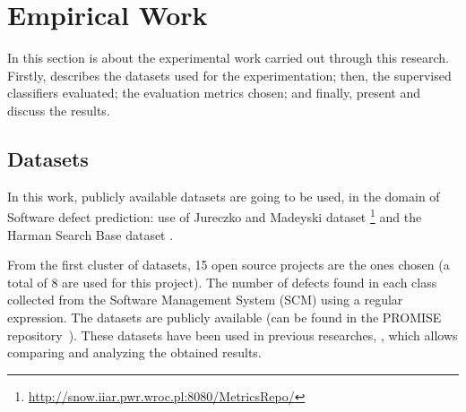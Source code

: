 %
%
%
% 
%
%
%
%

\chapter{Empirical Work}\label{chp:empwork}

In this section is about the experimental work carried out through this 
research. Firstly, describes the datasets used for the experimentation;
then, the supervised classifiers evaluated; the evaluation metrics chosen; and 
finally, present and discuss the results.

\section{Datasets}\label{sec:datasets}

In this work, publicly available datasets are going to be used, in the domain 
of Software defect prediction: use of Jureczko and Madeyski dataset
\footnote{\url{http://snow.iiar.pwr.wroc.pl:8080/MetricsRepo/}} 
\cite{Jureczko2010, MadeyskiJ2015} and the Harman Search Base dataset
\cite{Harman2014ssbse}. 

From the first cluster of datasets, 15 open source projects are the ones chosen 
(a total of 8 are used for this project). The number of defects found in each 
class collected from the Software Management System (SCM) using a regular 
expression. The datasets are publicly available  (can be found in the PROMISE 
repository~\cite{promiserepo}). These datasets have been used in previous 
researches, \cite{Xu2018, Wang2016, Xia2016}, which allows comparing and 
analyzing the obtained results.


